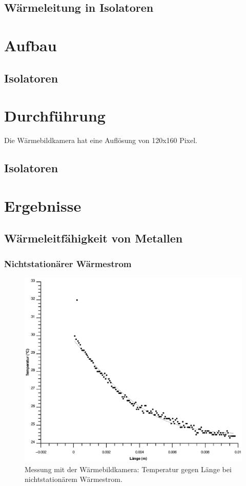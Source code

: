 \documentclass[12pt,a4paper,twopage]{article}
\begin{document}
\subsection{Wärmeleitung in Isolatoren}

\section{Aufbau}

\subsection{Isolatoren}
\section{Durchführung}
Die Wärmebildkamera hat eine Auflösung von 120x160 Pixel.
\subsection{Isolatoren}
\section{Ergebnisse}
\subsection{Wärmeleitfähigkeit von Metallen}
\subsubsection{Nichtstationärer Wärmestrom}

\begin{figure}[H]
\centering
\includegraphics[scale=0.8]{nichtstationaer.eps}
\caption{Messung mit der Wärmebildkamera: Temperatur gegen Länge bei nichtstationärem Wärmestrom.}
\end{figure}
\end{document}

